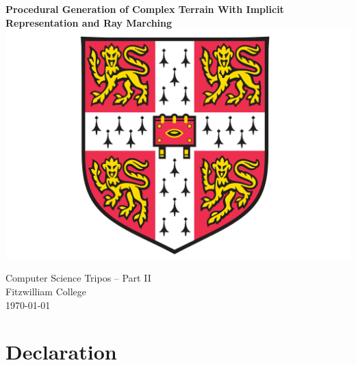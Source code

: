 \documentclass[12pt,a4paper,twoside,openright]{report}
\begin{document}


\pagestyle{empty}


\vspace*{25mm}
\begin{center}
	\Huge
	\textbf{Procedural Generation of Complex Terrain With Implicit Representation and Ray Marching} \\[20mm]

	\vspace{-2mm}
	\includegraphics[scale=0.45]{./figures/crest.png}
	\hspace{0mm}\\[20mm]
	\vspace{2mm}


	\LARGE
	Computer Science Tripos -- Part II \\[1mm]
	Fitzwilliam College \\[20mm]

	\Large
	\today
\end{center}

\newpage
\thispagestyle{empty}


\pagestyle{plain}


\section*{Declaration}
\end{document}

